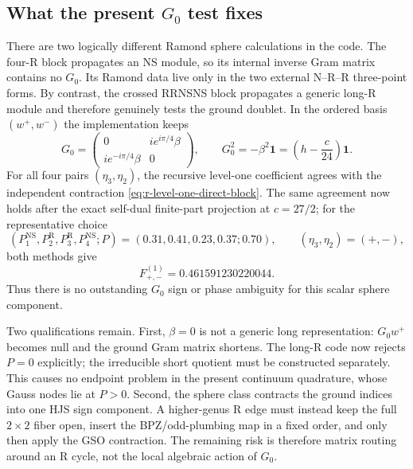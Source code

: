 \documentclass[11pt]{article}
\newcommand{\NS}{\mathrm{NS}}
\newcommand{\R}{\mathrm{R}}
\begin{document}
\subsection{\texorpdfstring{What the present $G_0$ test fixes}{What the present G0 test fixes}}

There are two logically different Ramond sphere calculations in the code.
The four-R block propagates an NS module, so its internal inverse Gram matrix
contains no $G_0$.  Its Ramond data live only in the two external N--R--R
three-point forms.  By contrast, the crossed RRNSNS block propagates a
generic long-R module and therefore genuinely tests the ground doublet.  In
the ordered basis $(w^+,w^-)$ the implementation keeps
\begin{equation}
 G_0=
 \begin{pmatrix}
 0&i e^{i\pi/4}\beta\\
 i e^{-i\pi/4}\beta&0
 \end{pmatrix},
 \qquad
 G_0^2=-\beta^2\mathbf 1
 =\left(h-\frac c{24}\right)\mathbf 1.
 \label{eq:g0-code-matrix}
\end{equation}
For all four pairs $(\eta_3,\eta_2)$, the recursive level-one coefficient
agrees with the independent contraction
\eqref{eq:r-level-one-direct-block}.  The same agreement now holds after
the exact self-dual finite-part projection at $c=27/2$; for the representative
choice
\begin{equation}
 (P_1^{\NS},P_2^{\R},P_3^{\R},P_4^{\NS};P)
 =(0.31,0.41,0.23,0.37;0.70),
 \qquad(\eta_3,\eta_2)=(+,-),
\end{equation}
both methods give
\begin{equation}
 F^{(1)}_{+,-}=0.461591230220044.
 \label{eq:g0-self-dual-anchor}
\end{equation}
Thus there is no outstanding $G_0$ sign or phase ambiguity for this scalar
sphere component.

Two qualifications remain.  First, $\beta=0$ is not a generic long
representation: $G_0w^+$ becomes null and the ground Gram matrix shortens.
The long-R code now rejects $P=0$ explicitly; the irreducible short quotient
must be constructed separately.  This causes no endpoint problem in the
present continuum quadrature, whose Gauss nodes lie at $P>0$.  Second, the
sphere class contracts the ground indices into one HJS sign component.  A
higher-genus R edge must instead keep the full $2\times2$ fiber open, insert
the BPZ/odd-plumbing map in a fixed order, and only then apply the GSO
contraction.  The remaining risk is therefore matrix routing around an R
cycle, not the local algebraic action of $G_0$.
\end{document}
